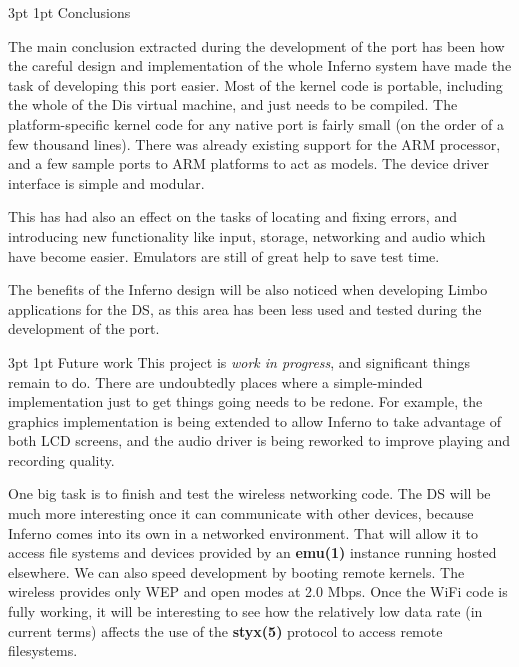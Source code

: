 \documentclass[11pt]{p9article}
\makeatletter
\renewcommand\section{\@startsection {section}{1}{\z@} {3pt} {1pt}
{\normalfont\normalsize\bfseries}}
\makeatother
\begin{document}
\section{Conclusions}

The main conclusion extracted during the development of the port has been
how the careful design and implementation of the whole Inferno system
have made the task of developing this port easier.
Most of the kernel code is portable, including the whole of the Dis virtual machine,
and just needs to be compiled. The platform-specific kernel code for any native
port is fairly small (on the order of a few thousand lines).
There was already existing support for the ARM processor, and a few sample ports to
ARM platforms to act as models.  The device driver interface is simple and modular.

This has had also an effect on the tasks of locating and fixing errors,
and introducing new functionality like input, storage, networking and audio
which have become easier.
Emulators are still of great help to save test time.

The benefits of the Inferno design \cite{inferno-os} will be also noticed
when developing Limbo applications for the DS,
as this area has been less used and tested during the development of the port.

\section{Future work}
This project is \emph{work in progress}, and significant things remain to do.
There are undoubtedly places where a simple-minded implementation just to get things going needs to be redone.
For example, the graphics implementation is being extended to allow
Inferno to take advantage of both LCD screens, and the audio driver is being reworked
to improve playing and recording quality.

One big task is to finish and test the wireless networking code.
The DS will be much more interesting once it can communicate with other devices,
because Inferno comes into its own in a networked environment.
That will allow it to access file systems and devices provided by an \textbf{emu(1)} instance running hosted elsewhere.
We can also speed development by booting remote kernels.
The wireless provides only WEP and open modes at 2.0 Mbps. Once the WiFi code is fully working,
it will be interesting to see how the relatively low data rate (in current terms)
affects the use of the \textbf{styx(5)} protocol to access remote filesystems.
\end{document}
